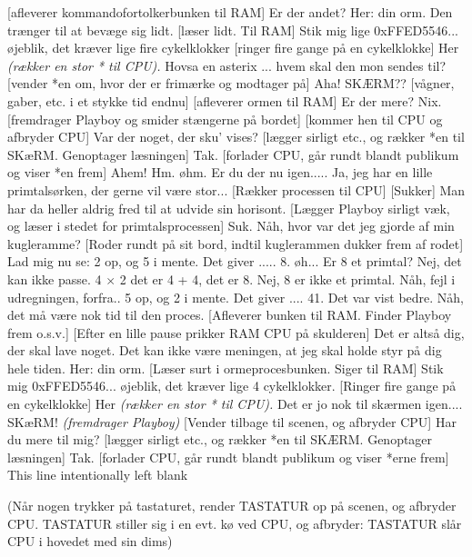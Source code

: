 \documentclass[a4paper,11pt]{article}
\begin{document}
\begin{sketch}
[afleverer kommandofortolkerbunken til RAM] Er der andet?
 Her: din orm. Den trænger til at bevæge sig lidt.
[læser lidt. Til RAM] Stik mig lige 0xFFED5546...
 øjeblik, det kræver lige fire cykelklokker 
[ringer fire gange på en cykelklokke] Her {\em (rækker
en stor * til CPU).}
 Hovsa en asterix ... hvem skal den mon sendes til?
[vender *en om, hvor der er frimærke og modtager på] Aha! SKÆRM??
[vågner, gaber, etc. i et stykke tid endnu]
[afleverer ormen til RAM] Er der mere?
 Nix.
[fremdrager Playboy og smider stængerne på bordet]
[kommer hen til CPU og afbryder CPU] Var der noget,
      der sku' vises?
[lægger sirligt etc., og rækker *en til SKæRM.
Genoptager læsningen]
 Tak. 
[forlader CPU, går rundt blandt publikum og viser
      *en frem]
 Ahem! Hm. øhm. 
 Er du der nu igen.....
 Ja, jeg har en lille primtalsørken, der gerne vil være stor...
[Rækker processen til CPU]
[Sukker] Man har da heller aldrig fred til at udvide sin horisont.
[Lægger Playboy sirligt væk, og læser i stedet for
primtalsprocessen] Suk. Nåh, hvor var det jeg gjorde af min kugleramme?
[Roder rundt på sit bord, indtil kuglerammen dukker frem
af rodet] Lad mig nu se: 2 op, og 5 i mente. Det giver ..... 8. øh...
Er 8 et primtal? Nej, det kan ikke passe. 4 $\times$ 2 det er 4 + 4,
det er 8. Nej, 8 er ikke et primtal. Nåh, fejl i udregningen,
forfra.. 5 op, og 2 i mente. Det giver .... 41. Det var vist bedre.
Nåh, det må være nok tid til den proces.
[Afleverer bunken til RAM. Finder Playboy frem o.s.v.]
[Efter en lille pause prikker RAM CPU på skulderen] Det
er altså dig, der skal lave noget. Det kan ikke være meningen, at
jeg skal holde styr på dig hele tiden. Her: din orm.
[Læser surt i ormeprocesbunken. Siger til RAM] Stik mig
0xFFED5546... 
 øjeblik, det kræver lige 4 cykelklokker.
[Ringer fire gange på en cykelklokke] Her {\em (rækker
en stor * til CPU).}
 Det er jo nok til skærmen igen.... SKæRM! {\em
(fremdrager Playboy)} 
[Vender tilbage til scenen, og afbryder CPU] Har du
mere til mig?
[lægger sirligt etc., og rækker *en til SKÆRM.
Genoptager læsningen]
 Tak. 
[forlader CPU, går rundt blandt publikum og viser
      *erne frem] This line intentionally left blank

\scene
(Når nogen trykker på tastaturet, render TASTATUR op på scenen, og
afbryder CPU. TASTATUR stiller sig i en evt. kø ved CPU, og afbryder:
TASTATUR slår CPU i hovedet med sin dims)


\end{sketch}
\end{document}
